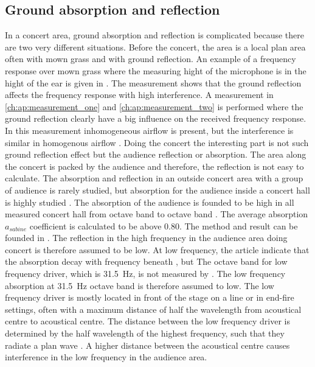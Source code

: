 \subsection{Ground absorption and reflection}\label{ana:ground_ref}
In a concert area, ground absorption and reflection is complicated because there are two very different situations. Before the concert, the area is a local plan area often with mown grass and with ground reflection.  An example of a frequency response over mown grass where the measuring hight of the microphone is in the hight of the ear is given in \citep{review_of_sound}. The measurement shows that the ground reflection affects the frequency response with high interference. 
A measurement in \autoref{ch:ap:measurement_one} and \autoref{ch:ap:measurement_two} is performed where the ground reflection clearly have a big influence on the received frequency response. In this measurement inhomogeneous airflow is present, but the interference is similar in homogenous airflow \citep{review_of_sound}. Doing the concert the interesting part is not such ground reflection effect but the audience reflection or absorption.  The area along the concert is packed by the audience and therefore, the reflection is not easy to calculate. The absorption and reflection in an outside concert area with a group of audience is rarely studied, but absorption for the audience inside a concert hall is highly studied \citep{audience_abso}. The absorption of the audience is founded to be high in all measured concert hall from  octave band to  octave band \citep{audience_abso}. The average absorption $a_{sabine}$ coefficient is calculated to be above 0.80. The method and result can be founded in \citep{audience_abso}. The reflection in the high frequency in the audience area doing concert is therefore assumed to be low. At low frequency, the article \citep{audience_abso} indicate that the absorption decay with frequency beneath  , but The octave band for low frequency driver, which is \SI{31.5}{\hertz}, is not measured by \citep{audience_abso}. The low frequency absorption at \SI{31.5}{\hertz} octave band is therefore assumed to low. The low frequency driver is mostly located in front of the stage on a line or in end-fire settings, often with a maximum distance of half the wavelength from acoustical centre to acoustical centre. The distance between the low frequency driver is determined by the half wavelength of the highest frequency, such that they radiate a plan wave \citep{bauman2001wavefront}. A higher distance between the acoustical centre causes interference in the low frequency in the audience area. 




